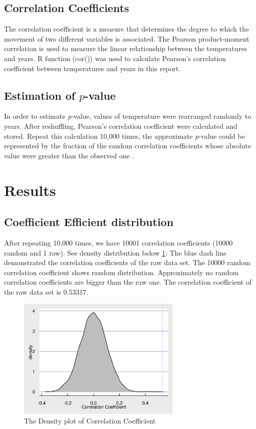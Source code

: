 \documentclass[12pt]{article}
\begin{document}
\subsection{Correlation Coefficients}
The correlation coefficient is a measure that determines the degree to which the movement of two different variables is associated. The Pearson product-moment correlation is used to measure the linear relationship between the temperatures and years. R function (cor())  was used to calculate Pearson's correlation coefficient between temperatures and years in this report.

\subsection{Estimation of \texorpdfstring{$\mathit{p}$}{}-value}
In order to estimate \textit{p}-value, values of temperature were rearranged randomly to years. After reshuffling, Pearson's correlation coefficient were calculated and stored. Repeat this calculation 10,000 times, the approximate \textit{p}-value could be represented by the fraction of the random correlation coefficients whose absolute value were greater than the observed one .

\section{Results}

\subsection{Coefficient Efficient distribution}
After repeating 10,000 times, we have 10001 correlation coefficients (10000 random and 1 raw). See density distribution below \ref{fig:Density_plot}:
The blue dash line demonstrated the correlation coefficients of the raw data set. The 10000 random correlation coefficient shows random distribution. Approximately no random correlation coefficients are bigger than the raw one. The correlation coefficient of the raw data set is 0.53317.
\begin{figure}[H]
\centering
\includegraphics[width=0.7\textwidth]{Density_plot.png}
\caption{\label{fig:Density_plot}The Density plot of Correlation Coefficient}
\end{figure}
\end{document}
